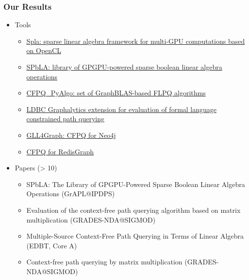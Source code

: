 \documentclass[xcolor=table,aspectratio=169]{beamer}
\begin{document}
\begin{frame}[fragile]
  \frametitle{Our Results}
    \begin{itemize}
      \item Tools
      \begin{itemize}
        \item \href{https://github.com/JetBrains-Research/spla}{Spla: sparse linear algebra framework for multi-GPU computations based on OpenCL}
        \item \href{https://github.com/JetBrains-Research/spbla}{SPbLA: library of GPGPU-powered sparse boolean linear algebra operations}    
        \pause
        \item \href{https://github.com/JetBrains-Research/CFPQ_PyAlgo}{CFPQ\_PyAlgo: set of GraphBLAS-based FLPQ algorithms}
        \item \href{https://github.com/JetBrains-Research/ldbc_graphalytics}{LDBC Graphalytics extension for evaluation of formal language constrained path querying}            
        \pause
        \item \href{https://github.com/JetBrains-Research/GLL4Graph}{GLL4Graph: CFPQ for Neo4j}
        \item \href{https://github.com/YaccConstructor/RedisGraph}{CFPQ for RedisGraph}
      \end{itemize}
      \item Papers (> 10)
      \begin{itemize}
        \item SPbLA: The Library of GPGPU-Powered Sparse Boolean Linear Algebra Operations (GrAPL@IPDPS)
        \item Evaluation of the context-free path querying algorithm based on matrix multiplication (GRADES-NDA@SIGMOD)
        \item Multiple-Source Context-Free Path Querying in Terms of Linear Algebra (EDBT, Core A)
        \item Context-free path querying by matrix multiplication (GRADES-NDA@SIGMOD)
      \end{itemize} 
    \end{itemize}
\end{frame}
\end{document}
